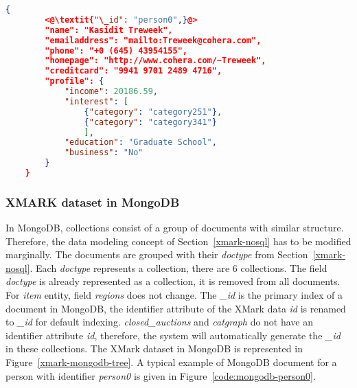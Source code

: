 \newbox\mongodbXmarkChart
\begin{lrbox}{\mongodbXmarkChart}
\end{lrbox}
\newbox\mongodbXmarkDocument
\begin{lrbox}{\mongodbXmarkDocument}
\begin{lstlisting}[language=JSON, basicstyle=\ttfamily\footnotesize]
    {
    	<@\textit{"\_id": "person0",}@>
    	"name": "Kasidit Treweek",
    	"emailaddress": "mailto:Treweek@cohera.com",
    	"phone": "+0 (645) 43954155",
    	"homepage": "http://www.cohera.com/~Treweek",
    	"creditcard": "9941 9701 2489 4716",
    	"profile": {
    		"income": 20186.59,
    		"interest": [
    			{"category": "category251"},
    			{"category": "category341"}
    			],
    		"education": "Graduate School",
    		"business": "No"
    	}
    }
\end{lstlisting}
\end{lrbox}




\subsubsection{XMARK dataset in MongoDB} \label{xmark-mongodb}
%

In MongoDB, collections consist of a group of documents with similar structure. Therefore, the data modeling concept of Section~\ref{xmark-nosql} has to be modified marginally. The documents are grouped with their \textit{doctype} from Section~\ref{xmark-nosql}. Each \textit{doctype} represents a collection, there are 6 collections. The field \textit{doctype} is already represented as a collection, it is removed from all documents.  
For \textit{item} entity,  field \textit{regions} does not change. The \textit{\_id} is the primary index of a document in MongoDB, the identifier attribute of the XMark data \textit{id} is renamed to \textit{\_id} for default indexing.  \textit{closed\_auctions} and \textit{catgraph} do not have an identifier attribute \textit{id}, therefore, the system will automatically generate the \textit{\_id} in these collections. The XMark dataset in MongoDB is represented in Figure~\ref{xmark-mongodb-tree}.
A typical example of MongoDB document for a person with identifier \textit{person0} is given in Figure~\ref{code:mongodb-person0}.	



